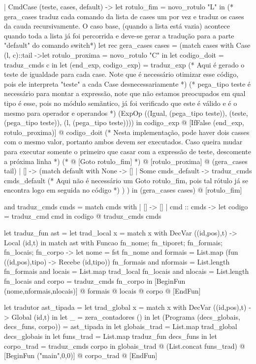 \documentclass[12pt,a4paper,twoside]{article}
\begin{document}
\begin{terminal}
  | CmdCase (teste, cases, default) ->
  let rotulo_fim = novo_rotulo "L" in
  (* gera_cases traduz cada comando da lista de cases um por vez
    e traduz os cases da cauda recursivamente.
    O caso base, (quando a lista está vazia) acontece quando toda a lista 
    já foi percorrida e deve-se gerar a tradução para a parte "default" do comando switch*)
    let rec gera_cases cases = (match cases with
        Case (l, c)::tail ->let rotulo_proxima = novo_rotulo "C" in
          let codigo_doit = traduz_cmds c in
          let (end_exp, codigo_exp) = traduz_exp 
          (* Aqui é gerado o teste de igualdade para cada case.
              Note que é necessário otimizar esse código, pois ele interpreta "teste" 
              a cada Case desnecessariamente *)
          (* pega_tipo teste é necessário para montar a expressão, note que não estamos preocupados
            em qual tipo é esse, pois no módulo semãntico, já foi verificado que este é válido e 
            é o mesmo para operador e operandos *)
          (ExpOp ((Igual, (pega_tipo teste)), (teste, (pega_tipo teste)), (l, (pega_tipo teste)))) in
          codigo_exp
          @ [IfFalse (end_exp, rotulo_proxima)] 
          @ codigo_doit
           (* Nesta implementação, pode haver dois casses com o mesmo valor, portanto ambos devem ser executados.
            Caso queira mudar para executar somente o primeiro que casar com a expressão de teste,
            descomente a próxima linha *)
          (* @ [Goto rotulo_fim]   *)
          @ [rotulo_proxima] 
          @ (gera_cases tail)
        | [] -> (match default with
            None -> [] 
            | Some cmds_default -> traduz_cmds cmds_default
          (* Aqui não é necessário um Goto rotulo_fim,
            pois tal rótulo já se encontra logo em seguida no código *)
        )
    )
     in (gera_cases cases) @ [rotulo_fim]



  
and traduz_cmds cmds =
  match cmds with
  | [] -> []
  | cmd :: cmds ->
     let codigo = traduz_cmd cmd in
     codigo @ traduz_cmds cmds

let traduz_fun ast =
  let trad_local x =
    match x with
      DecVar ((id,pos),t) -> Local (id,t)
  in
  match ast with
    Funcao {fn_nome; fn_tiporet; fn_formais; fn_locais; fn_corpo} ->  
    let nome = fst fn_nome
    and formais = List.map (fun ((id,pos),tipo) -> Recebe (id,tipo)) fn_formais
    and nformais = List.length fn_formais
    and locais = List.map trad_local fn_locais
    and nlocais = List.length fn_locais 
    and corpo = traduz_cmds fn_corpo 
    in
    [BeginFun (nome,nformais,nlocais)] @ formais @ locais @ corpo @ [EndFun]
        

let tradutor ast_tipada =
  let trad_global x =
    match x with
      DecVar ((id,pos),t) -> Global (id,t)
  in
  let _ = zera_contadores () in 
  let (Programa (decs_globais, decs_funs, corpo)) = ast_tipada in
  let globais_trad = List.map trad_global decs_globais in
  let funs_trad = List.map traduz_fun decs_funs in
  let corpo_trad = traduz_cmds corpo in
  globais_trad @ (List.concat funs_trad) @ 
  [BeginFun ("main",0,0)] @ corpo_trad @ [EndFun]
\end{terminal}
\end{document}
